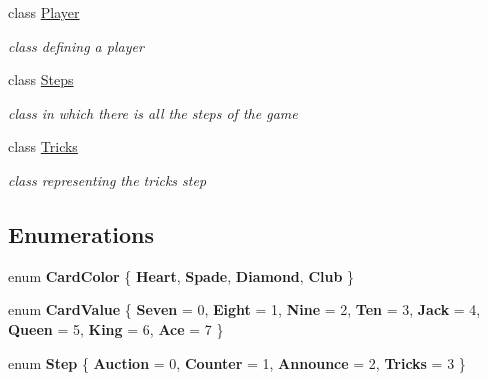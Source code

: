 \begin{DoxyCompactItemize}
class \hyperlink{class_coinche_1_1_player}{Player}
\begin{DoxyCompactList}\small\item\em class defining a player \end{DoxyCompactList}\item 
class \hyperlink{class_coinche_1_1_steps}{Steps}
\begin{DoxyCompactList}\small\item\em class in which there is all the steps of the game \end{DoxyCompactList}\item 
class \hyperlink{class_coinche_1_1_tricks}{Tricks}
\begin{DoxyCompactList}\small\item\em class representing the tricks step \end{DoxyCompactList}\end{DoxyCompactItemize}
\subsection*{Enumerations}
\begin{DoxyCompactItemize}
\item 
\mbox{\label{namespace_coinche_a74688723547f1c0e41be07e2db50ff84}} 
enum {\bfseries Card\+Color} \{ {\bfseries Heart}, 
{\bfseries Spade}, 
{\bfseries Diamond}, 
{\bfseries Club}
 \}
\item 
\mbox{\label{namespace_coinche_a518a3d6f6210ba36deb1e7fc33a589eb}} 
enum {\bfseries Card\+Value} \{ \newline
{\bfseries Seven} = 0, 
{\bfseries Eight} = 1, 
{\bfseries Nine} = 2, 
{\bfseries Ten} = 3, 
\newline
{\bfseries Jack} = 4, 
{\bfseries Queen} = 5, 
{\bfseries King} = 6, 
{\bfseries Ace} = 7
 \}
\item 
\mbox{\label{namespace_coinche_a08dfdc6c41e627cdae450a8dba7ff85e}} 
enum {\bfseries Step} \{ {\bfseries Auction} = 0, 
{\bfseries Counter} = 1, 
{\bfseries Announce} = 2, 
{\bfseries Tricks} = 3
 \}
\end{DoxyCompactItemize}
